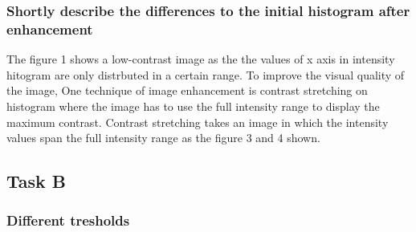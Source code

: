 \documentclass[11pt,a4paper]{scartcle}
\begin{document}

\hypertarget{shortly-describe-the-differences-to-the-initial-histogram-after-enhancement}{%
\subsubsection{Shortly describe the differences to the initial histogram
after
enhancement}\label{shortly-describe-the-differences-to-the-initial-histogram-after-enhancement}}
The figure 1 shows a low-contrast image as the the values of x axis in intensity hitogram are only distrbuted in a certain range. To improve the visual quality of the image, One technique of image enhancement is contrast stretching on histogram where the image has to use the full intensity range to display the maximum contrast. Contrast stretching takes an image in which the intensity values span the full intensity range as the figure 3 and 4 shown.
%

\hypertarget{task-b}{%
\subsection{Task B}\label{task-b}}

\hypertarget{different-tresholds}{%
\subsubsection{Different tresholds}\label{different-tresholds}}
\end{document}
